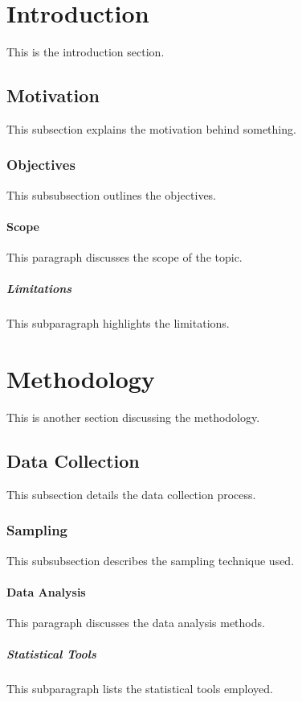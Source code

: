 \documentclass{article}
\begin{document}
\section{Introduction}
This is the introduction section.

\subsection{Motivation}
This subsection explains the motivation behind something.

\subsubsection{Objectives}
This subsubsection outlines the objectives.

\paragraph{Scope}
This paragraph discusses the scope of the topic.

\subparagraph{Limitations}
This subparagraph highlights the limitations.

\section{Methodology}
This is another section discussing the methodology.

\subsection{Data Collection}
This subsection details the data collection process.

\subsubsection{Sampling}
This subsubsection describes the sampling technique used.

\paragraph{Data Analysis}
This paragraph discusses the data analysis methods.

\subparagraph{Statistical Tools}
This subparagraph lists the statistical tools employed.
\end{document}
